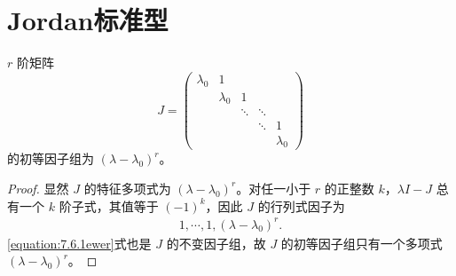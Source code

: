 \documentclass[../../main.tex]{subfiles}
\begin{document}
\section{Jordan标准型}

\begin{lemma}\label{lemma:Jordan块的初等因子组}
$r$ 阶矩阵
\[
J = \begin{pmatrix}
\lambda_0 & 1 & & & \\
& \lambda_0 & 1 & & \\
& & \ddots & \ddots & \\
& & & \ddots & 1 \\
& & & & \lambda_0
\end{pmatrix}
\]
的初等因子组为 $(\lambda - \lambda_0)^r$。
\end{lemma}
\begin{proof}
显然 $J$ 的特征多项式为 $(\lambda - \lambda_0)^r$。对任一小于 $r$ 的正整数 $k$，$\lambda I - J$ 总有一个 $k$ 阶子式，其值等于 $(-1)^k$，因此 $J$ 的行列式因子为
\begin{align}
1,\cdots,1,(\lambda - \lambda_0)^r.
\label{equation:7.6.1ewer}
\end{align}
\eqref{equation:7.6.1ewer}式也是 $J$ 的不变因子组，故 $J$ 的初等因子组只有一个多项式 $(\lambda - \lambda_0)^r$。
\end{proof}
\end{document}
